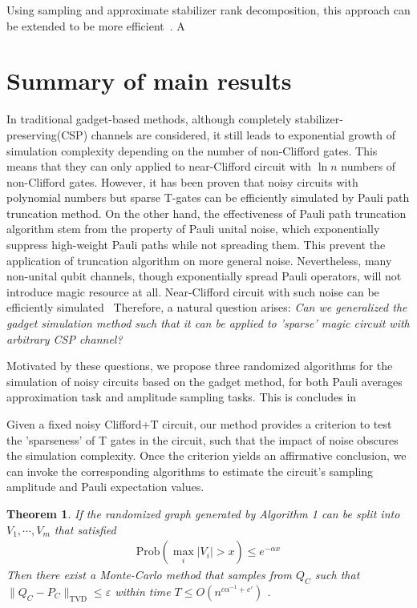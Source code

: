 \documentclass[aps,%
twocolumn,%
floatfix,%
pra,%
amsfonts,%
longbibliography,%
groupedaddress,%
superscriptaddress]{revtex4-2}%
\newtheorem{theorem}{Theorem}
\newcommand{\1}{\mathbbm{1}}
\begin{document}
Using sampling and approximate stabilizer rank decomposition, this approach can be extended to be more efficient~\cite{bravyi2016improved}. A 


\section{Summary of main results}
In traditional gadget-based methods, although completely stabilizer-preserving(CSP) channels are considered, it still leads to exponential growth of simulation complexity depending on the number of non-Clifford gates. 
This means that they can only applied to near-Clifford circuit with $\ln n$ numbers of non-Clifford gates.
However, it has been proven that noisy circuits with polynomial numbers but sparse T-gates can be efficiently simulated by Pauli path truncation method. 
On the other hand, the effectiveness of Pauli path truncation algorithm stem from the property of Pauli unital noise, which exponentially suppress high-weight Pauli paths while not spreading them. 
This prevent the application of truncation algorithm on more general noise.
Nevertheless, many non-unital qubit channels, though exponentially spread Pauli operators, will not introduce magic resource at all. Near-Clifford circuit with such noise can be efficiently simulated~\cite{seddon2021quantifying,}
Therefore, a natural question arises:
\textit{Can we generalized the gadget simulation method such that it can be applied to 'sparse' magic circuit with  arbitrary CSP channel?}

Motivated by these questions, we propose three randomized algorithms for the simulation of noisy circuits based on the gadget method, for both Pauli averages approximation task and amplitude sampling tasks. This is concludes in

Given a fixed noisy Clifford+T circuit, our method provides a criterion to test the 'sparseness' of T gates in the circuit, such that the impact of noise obscures the simulation complexity.  
Once the criterion yields an affirmative conclusion, we can invoke the corresponding algorithms to estimate the circuit's sampling amplitude and Pauli expectation values.  


\begin{theorem}
    If the randomized graph generated by Algorithm 1 can be split into $V_1,\cdots,V_m$ that satisfied
    \begin{align}
        \text{Prob}(\max_i|V_i| > x) \leq e^{-\alpha x}
    \end{align}
    Then there exist a Monte-Carlo method that samples from $Q_C$ such that $\|Q_C - P_C\|_{\text{TVD}} \leq \varepsilon$ within time $T \leq O(n^{c \alpha^{-1}+c'})$ . 
\end{theorem}
\end{document}
